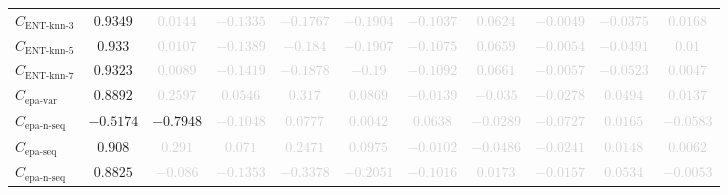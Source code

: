 \documentclass{standalone}
\newcommand{\entknnthreename}{\text{ENT-knn-3}}
\newcommand{\entknnthree}{C_{\entknnthreename}}
\newcommand{\entknnfivename}{\text{ENT-knn-5}}
\newcommand{\entknnfive}{C_{\entknnfivename}}
\newcommand{\entknnsevenname}{\text{ENT-knn-7}}
\newcommand{\entknnseven}{C_{\entknnsevenname}}
\newcommand{\epavariantname}{\text{epa-var}}
\newcommand{\epavariant}{C_{\epavariantname}}
\newcommand{\epanormvariant}{C_{\epanormsequencename}}
\newcommand{\epasequencename}{\text{epa-seq}}
\newcommand{\epasequence}{C_{\epasequencename}}
\newcommand{\epanormsequencename}{\text{epa-n-seq}}
\newcommand{\epanormsequence}{C_{\epanormsequencename}}
\begin{document}
\begin{tabular}{lcccccccccc}
$\entknnthree$ & $0.9349$ & \textcolor{lightgray}{$0.0144$} & \textcolor{lightgray}{$-0.1335$} & \textcolor{lightgray}{$-0.1767$} & \textcolor{lightgray}{$-0.1904$} & \textcolor{lightgray}{$-0.1037$} & \textcolor{lightgray}{$0.0624$} & \textcolor{lightgray}{$-0.0049$} & \textcolor{lightgray}{$-0.0375$} & \textcolor{lightgray}{$0.0168$} \\ 
$\entknnfive$ & $0.933$ & \textcolor{lightgray}{$0.0107$} & \textcolor{lightgray}{$-0.1389$} & \textcolor{lightgray}{$-0.184$} & \textcolor{lightgray}{$-0.1907$} & \textcolor{lightgray}{$-0.1075$} & \textcolor{lightgray}{$0.0659$} & \textcolor{lightgray}{$-0.0054$} & \textcolor{lightgray}{$-0.0491$} & \textcolor{lightgray}{$0.01$} \\ 
$\entknnseven$ & $0.9323$ & \textcolor{lightgray}{$0.0089$} & \textcolor{lightgray}{$-0.1419$} & \textcolor{lightgray}{$-0.1878$} & \textcolor{lightgray}{$-0.19$} & \textcolor{lightgray}{$-0.1092$} & \textcolor{lightgray}{$0.0661$} & \textcolor{lightgray}{$-0.0057$} & \textcolor{lightgray}{$-0.0523$} & \textcolor{lightgray}{$0.0047$} \\ 
$\epavariant$ & $0.8892$ & \textcolor{lightgray}{$0.2597$} & \textcolor{lightgray}{$0.0546$} & \textcolor{lightgray}{$0.317$} & \textcolor{lightgray}{$0.0869$} & \textcolor{lightgray}{$-0.0139$} & \textcolor{lightgray}{$-0.035$} & \textcolor{lightgray}{$-0.0278$} & \textcolor{lightgray}{$0.0494$} & \textcolor{lightgray}{$0.0137$} \\ 
$\epanormvariant$ & $-0.5174$ & $-0.7948$ & \textcolor{lightgray}{$-0.1048$} & \textcolor{lightgray}{$0.0777$} & \textcolor{lightgray}{$0.0042$} & \textcolor{lightgray}{$0.0638$} & \textcolor{lightgray}{$-0.0289$} & \textcolor{lightgray}{$-0.0727$} & \textcolor{lightgray}{$0.0165$} & \textcolor{lightgray}{$-0.0583$} \\ 
$\epasequence$ & $0.908$ & \textcolor{lightgray}{$0.291$} & \textcolor{lightgray}{$0.071$} & \textcolor{lightgray}{$0.2471$} & \textcolor{lightgray}{$0.0975$} & \textcolor{lightgray}{$-0.0102$} & \textcolor{lightgray}{$-0.0486$} & \textcolor{lightgray}{$-0.0241$} & \textcolor{lightgray}{$0.0148$} & \textcolor{lightgray}{$0.0062$} \\ 
$\epanormsequence$ & $0.8825$ & \textcolor{lightgray}{$-0.086$} & \textcolor{lightgray}{$-0.1353$} & \textcolor{lightgray}{$-0.3378$} & \textcolor{lightgray}{$-0.2051$} & \textcolor{lightgray}{$-0.1016$} & \textcolor{lightgray}{$0.0173$} & \textcolor{lightgray}{$-0.0157$} & \textcolor{lightgray}{$0.0534$} & \textcolor{lightgray}{$-0.0053$} \\ 

\end{tabular}
\end{document}

